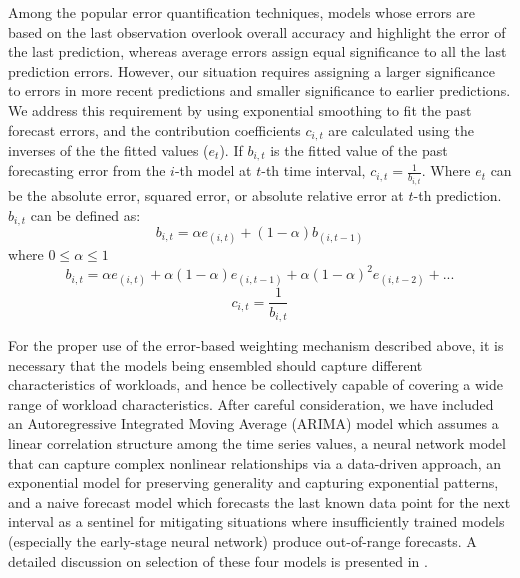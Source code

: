 Among the popular error quantification techniques, models whose errors are based on the last observation overlook overall accuracy and highlight the error of the last prediction, whereas average errors assign equal significance to all the last prediction errors. However, our situation requires assigning a larger significance to errors in more recent predictions and smaller significance to earlier predictions. We address this requirement by using exponential smoothing to fit the past forecast errors, and the contribution coefficients $c_{i,t}$ are calculated using the inverses of the the fitted values ($e_{t}$). If $b_{i,t}$ is the fitted value of the past forecasting error from the $i$-th model at $t$-th time interval, $c_{i,t}=\frac{1}{b_{i,t}}$. Where $e_{t}$ can be the absolute error, squared error, or absolute relative error at $t$-th prediction. $b_{i,t}$ can be defined as:
\begin{equation} \label{eq:1}
b_{i,t}= \alpha e_{(i,t)} + (1-\alpha)b_{(i,t-1)}
\end{equation}
where $0\leq \alpha \leq 1$
\begin{equation}\nonumber
b_{i,t}=\alpha e_{(i,t)} + \alpha(1-\alpha)e_{(i,t-1)}+\alpha(1-\alpha)^2e_{(i,t-2)}+ . ..
\end{equation}
\begin{equation}
c_{i,t}=\frac{1}{b_{i,t}} 
\end{equation}

For the proper use of the error-based weighting mechanism described above, it is necessary that the models being ensembled should capture different characteristics of workloads, and hence be collectively capable of covering a wide range of workload characteristics. After careful consideration, we have included an Autoregressive Integrated Moving Average (ARIMA) model which assumes a linear correlation structure among the time series values, a neural network model that can capture complex nonlinear relationships via a data-driven approach, an exponential model for preserving generality and capturing exponential patterns, and a naive forecast model which forecasts the last known data point for the next interval as a sentinel for mitigating situations where insufficiently trained models (especially the early-stage neural network) produce out-of-range forecasts. A detailed discussion on selection of these four models is presented in \cite{cloudtech}.